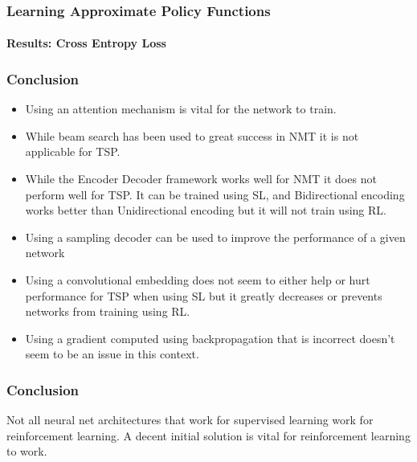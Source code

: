 \documentclass{beamer}
\begin{document}
\begin{frame}
  \frametitle{Learning Approximate Policy Functions}
  \framesubtitle{Results: Cross Entropy Loss}

  \begin{figure}[H]
    \centering
  \end{figure}

\end{frame}


\begin{frame}
  \frametitle{Conclusion}

  \begin{itemize}
  \item Using an attention mechanism is vital for the network to train.
  \item While beam search has been used to great success in NMT it is not applicable for TSP.
  \item While the Encoder Decoder framework works well for NMT it does not perform well for TSP. It can be trained using SL, and Bidirectional encoding works better than Unidirectional encoding but it will not train using RL.
  \item Using a sampling decoder can be used to improve the performance of a given network
  \item Using a convolutional embedding does not seem to either help or hurt performance for TSP when using SL but it greatly decreases or prevents networks from training using RL.
  \item Using a gradient computed using backpropagation that is incorrect doesn't seem to be an issue in this context.
  \end{itemize}

\end{frame}


\begin{frame}
  \frametitle{Conclusion}

  Not all neural net architectures that work for supervised learning work for reinforcement learning. A decent initial solution is vital for reinforcement learning to work.

  \begin{figure}[H]
    \centering
  \end{figure}

  \begin{figure}[H]
    \centering
    \makebox[\textwidth]{\texttt{[image: fc\_0]}}
  \end{figure}

\end{frame}
\end{document}

